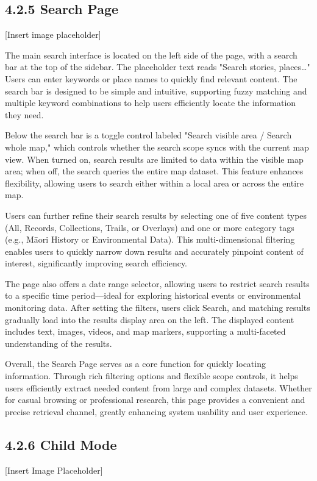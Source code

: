 \subsection*{4.2.5 Search Page}
[Insert image placeholder]

The main search interface is located on the left side of the page, with a search bar at the top of the sidebar. The placeholder text reads "Search stories, places…" Users can enter keywords or place names to quickly find relevant content. The search bar is designed to be simple and intuitive, supporting fuzzy matching and multiple keyword combinations to help users efficiently locate the information they need.

Below the search bar is a toggle control labeled "Search visible area / Search whole map," which controls whether the search scope syncs with the current map view. When turned on, search results are limited to data within the visible map area; when off, the search queries the entire map dataset. This feature enhances flexibility, allowing users to search either within a local area or across the entire map.

Users can further refine their search results by selecting one of five content types (All, Records, Collections, Trails, or Overlays) and one or more category tags (e.g., Māori History or Environmental Data). This multi-dimensional filtering enables users to quickly narrow down results and accurately pinpoint content of interest, significantly improving search efficiency.

The page also offers a date range selector, allowing users to restrict search results to a specific time period—ideal for exploring historical events or environmental monitoring data. After setting the filters, users click Search, and matching results gradually load into the results display area on the left. The displayed content includes text, images, videos, and map markers, supporting a multi-faceted understanding of the results.

Overall, the Search Page serves as a core function for quickly locating information. Through rich filtering options and flexible scope controls, it helps users efficiently extract needed content from large and complex datasets. Whether for casual browsing or professional research, this page provides a convenient and precise retrieval channel, greatly enhancing system usability and user experience.

\subsection*{4.2.6 Child Mode}
[Insert Image Placeholder]

